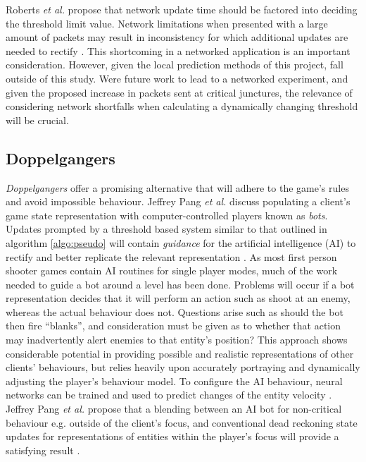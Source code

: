 \documentclass[journal]{IEEEtran}
\begin{document}
Roberts \textit{et al.} propose that network update time should be factored into deciding the threshold limit value. Network limitations when presented with a large amount of packets may result in inconsistency for which additional updates are needed to rectify \cite{roberts2008bounding}. This shortcoming in a networked application is an important consideration. However, given the local prediction methods of this project, fall outside of this study. Were future work to lead to a networked experiment, and given the proposed increase in packets sent at critical junctures, the relevance of considering network shortfalls when calculating a dynamically changing threshold will be crucial.




\subsection{Doppelgangers}

\textit{Doppelgangers} offer a promising alternative that will adhere to the game's rules and avoid impossible behaviour. Jeffrey Pang \textit{et al.} discuss populating a client's game state representation with computer-controlled players known as \textit{bots}. Updates prompted by a threshold based system similar to that outlined in algorithm \ref{algo:pseudo} will contain \textit{guidance} for the artificial intelligence (AI) to rectify and better replicate the relevant representation \cite{pang2007scaling} \cite{bharambe2008donnybrook}. As most first person shooter games contain AI routines for single player modes, much of the work needed to guide a bot around a level has been done. Problems will occur if a bot representation decides that it will perform an action such as shoot at an enemy, whereas the actual behaviour does not. Questions arise such as should the bot then fire ``blanks'', and consideration must be given as to whether that action may inadvertently alert enemies to that entity's position? This approach shows considerable potential in providing possible and realistic representations of other clients' behaviours, but relies heavily upon accurately portraying and dynamically adjusting the player's behaviour model. To configure the AI behaviour, neural networks can be trained and used to predict changes of the entity velocity \cite{mccoy2007multistep}. Jeffrey Pang \textit{et al.} propose that a blending between an AI bot for non-critical behaviour e.g. outside of the client's focus, and conventional dead reckoning state updates for representations of entities within the player's focus will provide a satisfying result \cite{pang2007scaling}.
\end{document}
